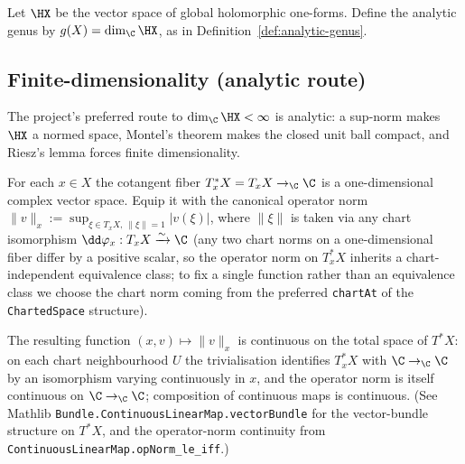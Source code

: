 Let \(\HX\) be the vector space of global holomorphic one-forms. Define the
analytic genus by \(g(X)=\dim_{\C}\HX\), as in
Definition~\ref{def:analytic-genus}.

\subsection{Finite-dimensionality (analytic route)}

The project's preferred route to \(\dim_{\C}\HX<\infty\) is analytic: a
sup-norm makes \(\HX\) a normed space, Montel's theorem makes the closed
unit ball compact, and Riesz's lemma forces finite dimensionality.

\begin{definition}
\label{def:cotangent-fiber-norm}
For each \(x\in X\) the cotangent fiber
\(T^{*}_{x}X = T_{x}X \to_{\C}\C\) is a one-dimensional complex vector
space. Equip it with the canonical operator norm
\(\|v\|_{x} := \sup_{\xi\in T_{x}X,\ \|\xi\|=1} |v(\xi)|\),
where \(\|\xi\|\) is taken via any chart isomorphism
\(\dd\varphi_{x}: T_{x}X \xrightarrow{\sim} \C\) (any two chart norms
on a one-dimensional fiber differ by a positive scalar, so the operator
norm on \(T^{*}_{x}X\) inherits a chart-independent equivalence class;
to fix a single function rather than an equivalence class we choose
the chart norm coming from the preferred \texttt{chartAt} of the
\texttt{ChartedSpace} structure).

The resulting function
\((x, v) \mapsto \|v\|_{x}\) is continuous on the total space of
\(T^{*}X\): on each chart neighbourhood \(U\) the trivialisation
identifies \(T^{*}_{x}X\) with \(\C\to_{\C}\C\) by an isomorphism
varying continuously in \(x\), and the operator norm is itself
continuous on \(\C\to_{\C}\C\); composition of continuous maps is
continuous. (See Mathlib
\texttt{Bundle.ContinuousLinearMap.vectorBundle} for the vector-bundle
structure on \(T^{*}X\), and the operator-norm continuity from
\texttt{ContinuousLinearMap.opNorm\_le\_iff}.)
\leanok
\end{definition}

